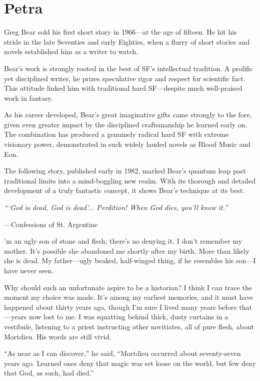 \chapter{Petra}

Greg Bear sold his first short story in 1966—at the age of fifteen. He hit his stride in the late Seventies and early Eighties, when a flurry of short stories and novels established him as a writer to watch.

Bear's work is strongly rooted in the best of SF's intellectual tradition. A prolific yet disciplined writer, he prizes speculative rigor and respect for scientific fact. This attitude linked him with traditional hard SF—despite much well-praised work in fantasy.

As his career developed, Bear's great imaginative gifts came strongly to the fore, given even greater impact by the disciplined craftsmanship he learned early on. The combination has produced a genuinely radical hard SF with extreme visionary power, demonstrated in such widely lauded novels as Blood Music and Eon.

The following story, published early in 1982, marked Bear's quantum leap past traditional limits into a mind-boggling new realm. With its thorough and detailed development of a truly fantastic concept, it shows Bear's technique at its best.

\textit{```God is dead, God is dead'... Perdition! When God dies, you’ll know it.''}

—Confessions of St. Argentine

\hrulefill

’m an ugly son of stone and flesh, there’s no denying it. I don’t remember my mother. It’s possible she abandoned me shortly after my birth. More than likely she is dead. My father—ugly beaked, half-winged thing, if he resembles his son—I have never seen.

Why should such an unfortunate aspire to be a historian? I think I can trace the moment my choice was made. It’s among my earliest memories, and it must have happened about thirty years ago, though I’m sure I lived many years before that—years now lost to me. I was squatting behind thick, dusty curtains in a vestibule, listening to a priest instructing other novitiates, all of pure flesh, about Mortdieu. His words are still vivid.

“As near as I can discover,” he said, “Mortdieu occurred about seventy-seven years ago. Learned ones deny that magic was set loose on the world, but few deny that God, as such, had died.”

